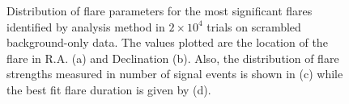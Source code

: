\documentclass{gatech-thesis}
\begin{document}
\begin{figure}\label{fig:scramble_trials_parameters}
\centering
{}
\caption{Distribution of flare parameters for the most significant flares identified by analysis method in $2\times 10^4$ trials on scrambled background-only data. The values plotted are the location of the flare in R.A. (a) and Declination (b). Also, the distribution of flare strengths measured in number of signal events is shown in (c) while the best fit flare duration is given by (d).} 
\end{figure}
\end{document}
